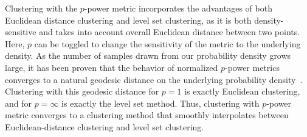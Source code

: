   Clustering with the $p$-power metric incorporates the
  advantages of both Euclidean distance clustering and level set
  clustering, as it is both density-sensitive and takes into account
  overall
  Euclidean distance between two points.
  Here, $p$ can be toggled to change the sensitivity of the metric
  to the underlying density.
  As the number of samples
  drawn from our probability density grows large, it has been proven that the behavior of
  normalized $p$-power metrics converges to a natural geodesic distance on the
  underlying probability density~\cite{hwang2016}. Clustering with
  this geodesic distance for $p=1$ is exactly Euclidean clustering, and for
  $p=\infty$ is exactly the level set method. 
   Thus, clustering with $p$-power metric converges to
  a clustering method that smoothly interpolates between
  Euclidean-distance clustering and level set clustering. 
